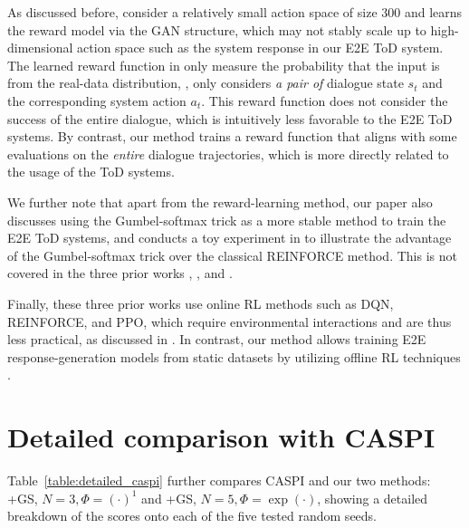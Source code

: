 As discussed before, \citet{li2020guided} consider a relatively small action space of size $300$ and learns the reward model via the GAN structure, which may not stably scale up to high-dimensional action space such as the system response in our E2E ToD system.
The learned reward function in \citet{li2020guided} only measure the probability that the input is from the real-data distribution, \ie, only considers \emph{a pair of} dialogue state $s_t$ and the corresponding system action $a_t$.
This reward function does not consider the success of the entire dialogue, which is intuitively less favorable to the E2E ToD systems.
By contrast, our method trains a reward function that aligns with some evaluations on the \emph{entire} dialogue trajectories, which is more directly related to the usage of the ToD systems.




We further note that apart from the reward-learning method, our paper also discusses using the Gumbel-softmax trick as a more stable method to train the E2E ToD systems, and conducts a toy experiment in  to illustrate the advantage of the Gumbel-softmax trick over the classical REINFORCE method.
This is not covered in the three prior works \citet{saito2018curriculum}, \citet{hu2018playing}, and \citet{li2020guided}.


Finally, these three prior works use online RL methods such as DQN, REINFORCE, and PPO, which require environmental interactions and are thus less practical, as discussed in .
In contrast, our method allows training E2E response-generation models from static datasets by utilizing offline RL techniques \citep[\eg,][]{offlinetutorial2020,td3bc2021,sdmgan2022,jointmatching2022,wmbrl2022}.


\clearpage
\section{Detailed comparison with CASPI} \label{sec:detailed_comp_caspi}

Table~\ref{table:detailed_caspi} further compares CASPI and our two methods: \rewardnet+GS, $N=3, \Phi=(\cdot)^1$ and  \rewardmle+GS, $N=5, \Phi=\exp(\cdot)$, showing a detailed breakdown of the scores onto each of the five tested  random seeds.

